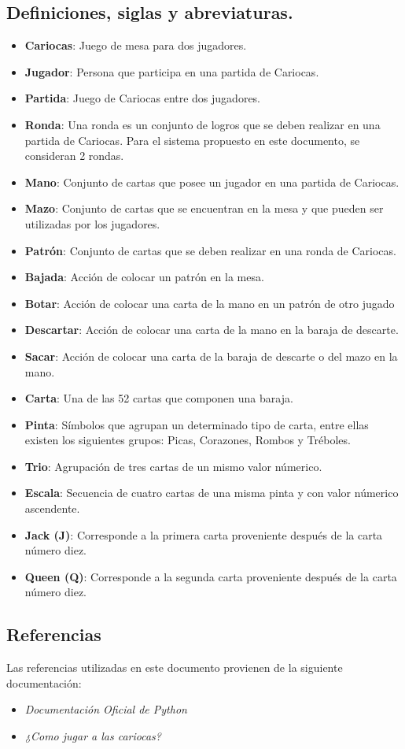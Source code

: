 \subsection{Definiciones, siglas y abreviaturas.}\label{cap:definiciones} 
\begin{itemize}
    \item \textbf{Cariocas}: Juego de mesa para dos jugadores.
    \item \textbf{Jugador}: Persona que participa en una partida de Cariocas.
    \item \textbf{Partida}: Juego de Cariocas entre dos jugadores.
    \item \textbf{Ronda}: Una ronda es un conjunto de logros que se deben realizar en una partida de Cariocas. Para el sistema propuesto en este documento, se consideran 2 rondas.
    \item \textbf{Mano}: Conjunto de cartas que posee un jugador en una partida de Cariocas.
    \item \textbf{Mazo}: Conjunto de cartas que se encuentran en la mesa y que pueden ser utilizadas por los jugadores.
    \item \textbf{Patrón}: Conjunto de cartas que se deben realizar en una ronda de Cariocas.
    \item \textbf{Bajada}: Acción de colocar un patrón en la mesa.
    \item \textbf{Botar}: Acción de colocar una carta de la mano en un patrón de otro jugado
    \item \textbf{Descartar}: Acción de colocar una carta de la mano en la baraja de descarte.
    \item \textbf{Sacar}: Acción de colocar una carta de la baraja de descarte o del mazo en la mano.
    \item \textbf{Carta}: Una de las 52 cartas que componen una baraja.
    \item \textbf{Pinta}: Símbolos que agrupan un determinado tipo de carta, entre ellas existen los siguientes grupos: Picas, Corazones, Rombos y Tréboles.
    \item \textbf{Trio}: Agrupación de tres cartas de un mismo valor númerico.
    \item \textbf{Escala}: Secuencia de cuatro cartas de una misma pinta y con valor númerico ascendente.
    \item \textbf{Jack (J)}: Corresponde a la primera carta proveniente después de la carta número diez.
    \item \textbf{Queen (Q)}: Corresponde a la segunda carta proveniente después de la carta número diez.
\end{itemize} 

\subsection{Referencias}
Las referencias utilizadas en este documento provienen de la siguiente documentación:
\begin{itemize}
    \item \textit{Documentación Oficial de Python} \cite{python}
    \item \textit{¿Como jugar a las cariocas?} \cite{cariocas}
\end{itemize}